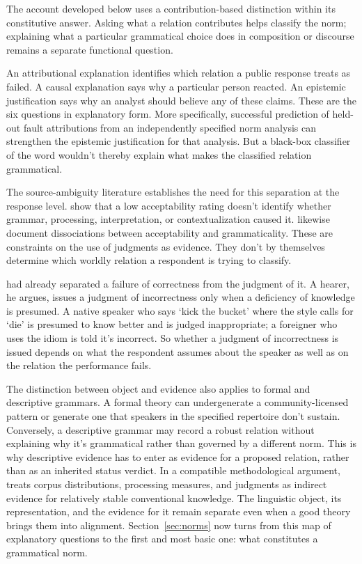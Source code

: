 \documentclass[12pt,letterpaper]{article}
\begin{document}
The account developed below uses a contribution-based distinction within its
constitutive answer. Asking what a relation contributes helps classify the norm;
explaining what a particular grammatical choice does in composition or discourse
remains a separate functional question.

An attributional explanation identifies which relation a public response treats
as failed. A causal explanation says why a particular person reacted. An epistemic
justification says why an analyst should believe any of these claims. These are
the six questions in explanatory form. More specifically, successful prediction
of held-out fault attributions from an independently specified norm analysis can
strengthen the epistemic justification for that analysis. But a black-box
classifier of the word
 wouldn't thereby explain what makes the classified relation
grammatical.

The source-ambiguity literature establishes the need for this separation at the
response level. \textcite[48--49]{hofmeisteretal2013source} show that a low acceptability
rating doesn't identify whether grammar, processing, interpretation, or
contextualization caused it. \textcite[1--4]{leivadawestergaard2020} likewise document
dissociations between acceptability and grammaticality. These are constraints on
the use of judgments as evidence. They don't by themselves determine which
worldly relation a respondent is trying to classify.

\textcite[98--101]{coseriu2019} had already separated a failure of correctness
from the judgment of it. A hearer, he argues, issues a judgment of incorrectness
only when a deficiency of knowledge is presumed. A native speaker who says
 `kick the bucket' where the style calls for 
`die' is presumed to know better and is judged inappropriate; a foreigner who uses
the idiom is told it's incorrect. So whether a judgment of incorrectness is issued
depends on what the respondent assumes about the speaker as well as on the
relation the performance fails.

The distinction between object and evidence also applies to formal and descriptive
grammars. A formal theory can undergenerate a
community-licensed pattern or generate one that speakers in the specified
repertoire don't sustain. Conversely, a descriptive grammar may record a robust relation without
explaining why it's grammatical rather than governed by a different norm. This
is why descriptive evidence has to enter as evidence for a proposed relation,
rather than as an inherited status verdict. In a compatible methodological
argument,
\textcite[16--17]{poulsen2012grammaticality} treats corpus distributions,
processing measures, and judgments as indirect evidence for relatively stable
conventional knowledge. The linguistic object, its representation, and the
evidence for it remain separate even when a good theory brings them into alignment.
Section~\ref{sec:norms} now turns from this map of explanatory questions to the
first and most basic one: what constitutes a grammatical norm.
\end{document}
